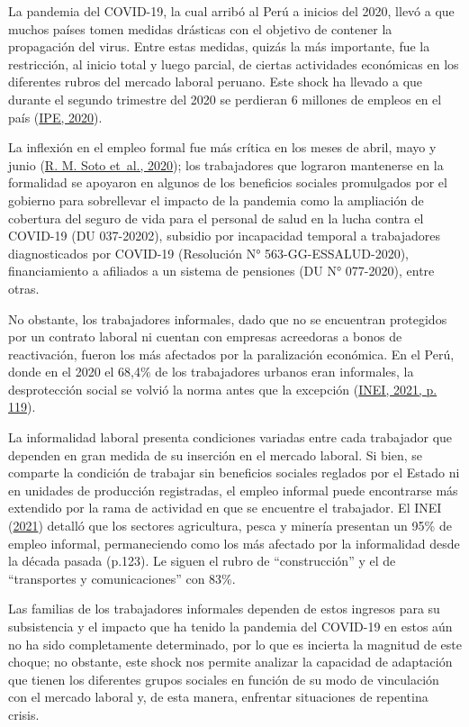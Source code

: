 \documentclass[
  letterpaper,
  12pt,
  oneside,
  spanish,
  doublespacing,
  headsepline,
  parskip]{MastersDoctoralThesis}
\begin{document}

La pandemia del COVID-19, la cual arribó al Perú a inicios del 2020,
llevó a que muchos países tomen medidas drásticas con el objetivo de
contener la propagación del virus. Entre estas medidas, quizás la más
importante, fue la restricción, al inicio total y luego parcial, de
ciertas actividades económicas en los diferentes rubros del mercado
laboral peruano. Este shock ha llevado a que durante el segundo
trimestre del 2020 se perdieran 6 millones de empleos en el país
(\protect\hyperlink{ref-ipe2020}{IPE, 2020}).

La inflexión en el empleo formal fue más crítica en los meses de abril,
mayo y junio (\protect\hyperlink{ref-soto2020}{R. M. Soto et~al.,
2020}); los trabajadores que lograron mantenerse en la formalidad se
apoyaron en algunos de los beneficios sociales promulgados por el
gobierno para sobrellevar el impacto de la pandemia como la ampliación
de cobertura del seguro de vida para el personal de salud en la lucha
contra el COVID-19 (DU 037-20202), subsidio por incapacidad temporal a
trabajadores diagnosticados por COVID-19 (Resolución N°
563-GG-ESSALUD-2020), financiamiento a afiliados a un sistema de
pensiones (DU N° 077-2020), entre otras.

No obstante, los trabajadores informales, dado que no se encuentran
protegidos por un contrato laboral ni cuentan con empresas acreedoras a
bonos de reactivación, fueron los más afectados por la paralización
económica. En el Perú, donde en el 2020 el 68,4\% de los trabajadores
urbanos eran informales, la desprotección social se volvió la norma
antes que la excepción (\protect\hyperlink{ref-inei2021}{INEI, 2021, p.
119}).

La informalidad laboral presenta condiciones variadas entre cada
trabajador que dependen en gran medida de su inserción en el mercado
laboral. Si bien, se comparte la condición de trabajar sin beneficios
sociales reglados por el Estado ni en unidades de producción
registradas, el empleo informal puede encontrarse más extendido por la
rama de actividad en que se encuentre el trabajador. El INEI
(\protect\hyperlink{ref-inei2021}{2021}) detalló que los sectores
agricultura, pesca y minería presentan un 95\% de empleo informal,
permaneciendo como los más afectado por la informalidad desde la década
pasada (p.123). Le siguen el rubro de ``construcción'' y el de
``transportes y comunicaciones'' con 83\%.

Las familias de los trabajadores informales dependen de estos ingresos
para su subsistencia y el impacto que ha tenido la pandemia del COVID-19
en estos aún no ha sido completamente determinado, por lo que es
incierta la magnitud de este choque; no obstante, este shock nos permite
analizar la capacidad de adaptación que tienen los diferentes grupos
sociales en función de su modo de vinculación con el mercado laboral y,
de esta manera, enfrentar situaciones de repentina crisis.
\end{document}
